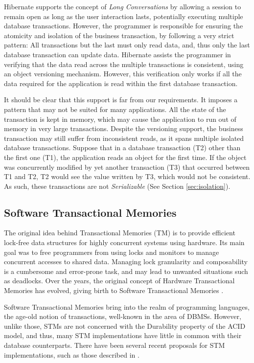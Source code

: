 \documentclass{llncs}
\begin{document}
Hibernate supports the concept of {\it Long Conversations} by allowing
a session to remain open as long as the user interaction lasts,
potentially executing multiple database transactions. However, the
programmer is responsible for ensuring the atomicity and isolation of
the business transaction, by following a very strict pattern: All
transactions but the last must only read data, and, thus only the last
database transaction can update data. Hibernate assists the programmer
in verifying that the data read across the multiple transactions is
consistent, using an object versioning mechanism. However, this
verification only works if all the data required for the application
is read within the first database transaction.

It should be clear that this support is far from our requirements. It
imposes a pattern that may not be suited for many applications.  All
the state of the transaction is kept in memory, which may cause the
application to run out of memory in very large transactions. Despite
the versioning support, the business transaction may still suffer from
inconsistent reads, as it spans multiple isolated database
transactions. Suppose that in a database transaction (T2) other than
the first one (T1), the application reads an object for the first
time. If the object was concurrently modified by yet another
transaction (T3) that occurred between T1 and T2, T2 would see the
value written by T3, which would not be consistent. As such, these
transactions are not {\it Serializable} (See Section
\ref{sec:isolation}).


\subsection{Software Transactional Memories}
\label{sec:stm}

The original idea behind Transactional Memories (TM)
\cite{herlihy1993transactional} is to provide efficient lock-free data
structures for highly concurrent systems using hardware. Its main goal
was to free programmers from using locks and monitors to manage
concurrent accesses to shared data. Managing lock granularity and
composability is a cumbersome and error-prone task, and may lead to
unwanted situations such as deadlocks. Over the years, the original
concept of Hardware Transactional Memories has evolved, giving birth
to Software Transactional Memories \cite{shavit1997software}.

Software Transactional Memories bring into the realm of programming
languages, the age-old notion of transactions, well-known in the area
of DBMSs. However, unlike those, STMs are not concerned with the
Durability property of the ACID model, and thus, many STM
implementations have little in common with their database
counterparts. There have been several recent proposals for STM
implementations, such as those described in
\cite{cachopo2006versioned, herlihy2003software, marathe2005adaptive,
  dice2006transactional, riegel2006lazy, marathe2006lowering}.
\end{document}
